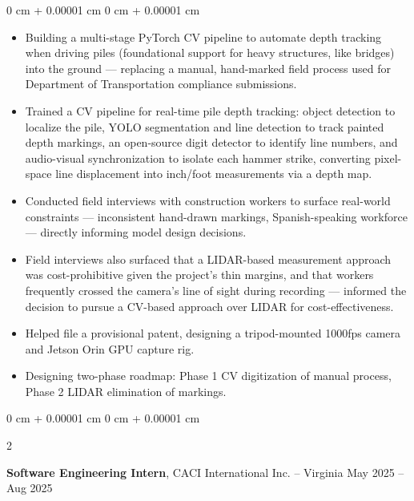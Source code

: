 \documentclass[10pt, letterpaper]{article}
\newenvironment{highlights}{
    \begin{itemize}[
        topsep=0.3 cm,
        parsep=0.05 cm,
        partopsep=0pt,
        itemsep=0.02 cm,
        leftmargin=0 cm + 10pt
    ]
}{
    \end{itemize}
} %
\newenvironment{onecolentry}{
    \begin{adjustwidth}{
        0 cm + 0.00001 cm
    }{
        0 cm + 0.00001 cm
    }
}{
    \end{adjustwidth}
} %
\newenvironment{twocolentry}[2][]{
    \onecolentry
    \def\secondColumn{#2}
    \setcolumnwidth{\fill, 4.5 cm}
    \begin{paracol}{2}
}{
    \switchcolumn \raggedleft \secondColumn
    \end{paracol}
    \endonecolentry
} %
\begin{document}
        \vspace{0.10 cm}
        \begin{onecolentry}
            \begin{highlights}
                \item Building a multi-stage PyTorch CV pipeline to automate depth tracking when driving piles (foundational support for heavy structures, like bridges) into the ground — replacing a manual, hand-marked field process used for Department of Transportation compliance submissions.
                \item Trained a CV pipeline for real-time pile depth tracking: object detection to localize the pile, YOLO segmentation and line detection to track painted depth markings, an open-source digit detector to identify line numbers, and audio-visual synchronization to isolate each hammer strike, converting pixel-space line displacement into inch/foot measurements via a depth map.
                \item Conducted field interviews with construction workers to surface real-world constraints — inconsistent hand-drawn markings, Spanish-speaking workforce — directly informing model design decisions.
                \item Field interviews also surfaced that a LIDAR-based measurement approach was cost-prohibitive given the project's thin margins, and that workers frequently crossed the camera's line of sight during recording — informed the decision to pursue a CV-based approach over LIDAR for cost-effectiveness.
                \item Helped file a provisional patent, designing a tripod-mounted 1000fps camera and Jetson Orin GPU capture rig.
                \item Designing two-phase roadmap: Phase 1 CV digitization of manual process, Phase 2 LIDAR elimination of markings.
            \end{highlights}
        \end{onecolentry}

        \vspace{0.10 cm}

        \begin{twocolentry}{
            May 2025 – Aug 2025
        }
            \textbf{Software Engineering Intern}, CACI International Inc. -- Virginia\end{twocolentry}
\end{document}
